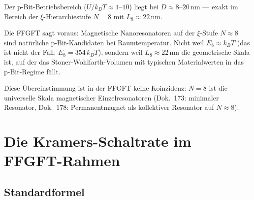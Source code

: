 	\begin{center}
	\end{center}
	
	Der p-Bit-Betriebsbereich ($U/k_BT \approx 1$--$10$) liegt bei
	$D \approx 8$--$20\,\text{nm}$ --- exakt im Bereich der
	$\xi$-Hierarchiestufe $N = 8$ mit $L_8 \approx 22\,\text{nm}$.
	
	\begin{foundation}[Geometrische Vorhersage: $N=8$ als natürlicher p-Bit-Anker]
		Die FFGFT sagt voraus: Magnetische Nanoresonatoren auf der
		$\xi$-Stufe $N \approx 8$ sind natürliche p-Bit-Kandidaten bei
		Raumtemperatur. Nicht weil $E_8 \approx k_BT$ (das ist nicht der Fall:
		$E_8 = 354\,k_BT$), sondern weil $L_8 \approx 22\,\text{nm}$ die
		geometrische Skala ist, auf der das Stoner-Wohlfarth-Volumen mit
		typischen Materialwerten in das p-Bit-Regime fällt.
		
		Diese Übereinstimmung ist in der FFGFT keine Koinzidenz:
		$N=8$ ist die universelle Skala magnetischer Einzelresonatoren
		(Dok.~173: minimaler Resonator, Dok.~178: Permanentmagnet als
		kollektiver Resonator auf $N\approx8$).
	\end{foundation}
	
	\section{Die Kramers-Schaltrate im FFGFT-Rahmen}
	\label{sec:kramers}
	
	\subsection{Standardformel}
	\label{subsec:kramers-standard}
	
